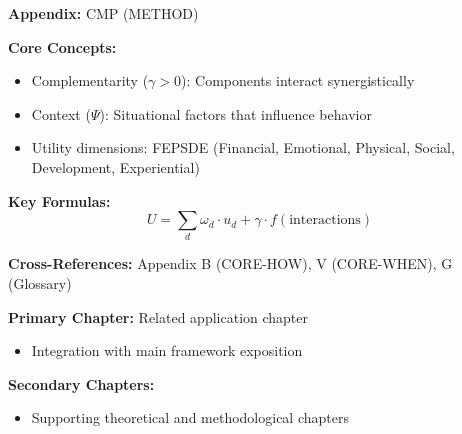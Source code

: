 \begin{tcolorbox}[colback=blue!5!white, colframe=blue!75!black,
    title=Quick Reference: Complementarity Measurement Methodology]

\textbf{Appendix:} CMP (METHOD)

\textbf{Core Concepts:}
\begin{itemize}[nosep]
\item Complementarity ($\gamma > 0$): Components interact synergistically
\item Context ($\Psi$): Situational factors that influence behavior
\item Utility dimensions: FEPSDE (Financial, Emotional, Physical, Social, Development, Experiential)
\end{itemize}

\textbf{Key Formulas:}
\begin{equation}
U = \sum_d \omega_d \cdot u_d + \gamma \cdot f(\text{interactions})
\end{equation}

\textbf{Cross-References:} Appendix B (CORE-HOW), V (CORE-WHEN), G (Glossary)
\end{tcolorbox}






\begin{tcolorbox}[colback=purple!5!white, colframe=purple!75!black,
    title=Chapter Linkage]

\textbf{Primary Chapter:} Related application chapter
\begin{itemize}[nosep]
\item Integration with main framework exposition
\end{itemize}

\textbf{Secondary Chapters:}
\begin{itemize}[nosep]
\item Supporting theoretical and methodological chapters
\end{itemize}

\end{tcolorbox}

